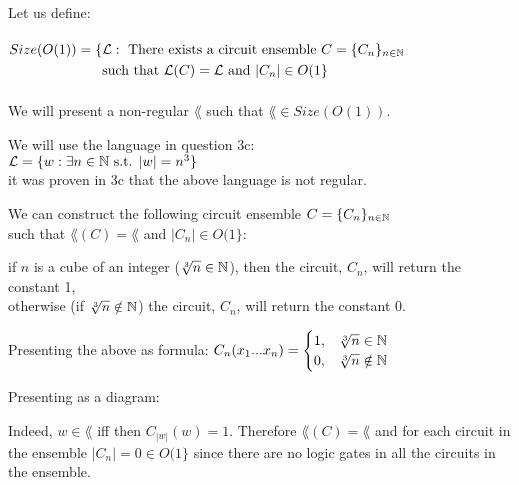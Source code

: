 Let us define: \\ \\
$
    \begin{aligned}
        Size(O(1)) = \{ & \mathcal{L} : \text{ There exists a circuit ensemble } C=\{C_n\}_{n \in \mathbb{N}} \\
                        & \text{such that } \mathcal{L}(C)=\mathcal{L} \text{ and } |C_n|\in O(1\}
    \end{aligned}
$ \\ \\
We will present a non-regular $\lang$ such that $\lang \in Size(O(1))$.

We will use the language in question 3c: \\
$\mathcal{L}=\{w : \exists n \in \mathbb{N} \text{ s.t. } |w| = n^3\}$ \\
it was proven in 3c that the above language is not regular.

We can construct the following circuit ensemble $C=\{C_n\}_{n \in \mathbb{N}}$ \\
such that $\lang(C)=\lang$ and $|C_n|\in O(1\}$:

if $n$ is a cube of an integer ($\sqrt[3]{n} \in \mathbb{N}$), then the circuit, $C_n$, will return the constant 1, \\
otherwise (if $\sqrt[3]{n} \notin \mathbb{N}$) the circuit, $C_n$, will return the constant 0.

Presenting the above as formula:
$
    C_n(x_1 ... x_n) =
    \begin{cases}
        1 , & \sqrt[3]{n} \in \mathbb{N}    \\
        0 , & \sqrt[3]{n} \notin \mathbb{N} \\
    \end{cases}
$

Presenting as a diagram: \\
\textcolor{red}
{
}

Indeed, $w \in \lang$ iff then $C_{|w|}(w)=1$.
Therefore $\lang(C)=\lang$ and for each circuit in the ensemble $|C_n| = 0 \in O(1\}$ since there are no logic
gates in all the circuits in the ensemble.